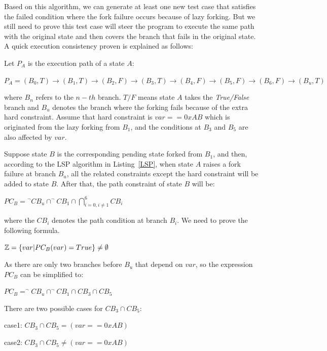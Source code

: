 
Based on this algorithm, we can generate at least one new test case that satisfies the failed condition where the fork failure occurs because of lazy forking. But we still need to prove this test case will steer the program to execute the same path with the original state and then covers the branch that fails in the original state. A quick execution consistency proven is explained as follows:

Let $P_A$ is the execution path of a state $A$:
\begin{center}
$P_A = (B_0,T) \rightarrow (B_1,T) \rightarrow (B_2,F) \rightarrow (B_3,T)
\rightarrow (B_4,F) \rightarrow (B_5,F) \rightarrow (B_6,F) \rightarrow (B_u,T)$
\end{center}

\noindent where $B_n$ refers to the $n-th$ branch. $T/F$ means state $A$ takes the \emph{True/False} branch and $B_u$ denotes the branch where the forking fails because of the extra hard constraint. Assume that hard constraint is $var==0xAB$ which is originated from the lazy forking from $B_1$, and the conditions at $B_3$ and $B_5$ are also affected by $var$.

Suppose state $B$ is the corresponding pending state forked from $B_1$, and then, according to the LSP algorithm in Listing~\ref{LSP}, when state $A$ raises a fork failure at branch $B_u$, all the related constraints except the hard constraint will be added to state $B$. After that, the path constraint of state $B$ will be:
\begin{center}
$PC_B = \displaystyle ^\neg CB_u \cap ^\neg CB_1 \cap \bigcap\limits_{i=0,i \neq 1}^{6} CB_i$
\end{center}
\noindent where the $CB_i$ denotes the path condition at branch $B_i$. We need to prove the following formula.
\begin{center}
$\mathbb{Z} = \{var\arrowvert PC_B(var) = True\} \neq \emptyset$
\end{center}

As there are only two branches before $B_u$ that depend on $var$, so the expression $PC_B$ can be simplified to:
\begin{center}
$PC_B = ^\neg CB_u \cap ^\neg CB_1 \cap CB_3 \cap CB_5$
\end{center}

There are two possible cases for $CB_3 \cap CB_5$:
\begin{center}
case1: $CB_3 \cap CB_5 = (var == 0xAB)$

case2: $CB_3 \cap CB_5 \neq (var == 0xAB)$
\end{center}

